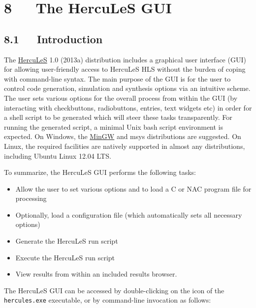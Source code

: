 \documentclass[a4paper]{article}
\begin{document}
\section{8~~~The HercuLeS GUI%
  \label{the-hercules-gui}%
}


\subsection{8.1~~~Introduction%
  \label{id3}%
}

The \href{http://www.ajaxcompilers.com/technology/hercules-high-level-synthesis}{HercuLeS} 1.0 (2013a) distribution includes a graphical user interface (GUI) for allowing user-friendly access to HercuLeS HLS without the burden of coping with command-line syntax. The main purpose of the GUI is for the user to control code generation, simulation and synthesis options via an intuitive scheme. The user
sets various options for the overall process from within the GUI (by interacting with checkbuttons, radiobuttons, entries, text widgets etc) in order for a shell script to be generated which will steer these tasks transparently. For running the generated script, a minimal Unix bash script environment is expected. On Windows, the \href{http://www.mingw.org}{MinGW} and msys distributions are suggested. On Linux, the required facilities are natively supported in almost any distributions, including Ubuntu Linux 12.04 LTS.

To summarize, the HercuLeS GUI performs the following tasks:
%
\begin{itemize}

\item Allow the user to set various options and to load a C or NAC program file for processing

\item Optionally, load a configuration file (which automatically sets all necessary options)

\item Generate the HercuLeS run script

\item Execute the HercuLeS run script

\item View results from within an included results browser.

\end{itemize}

The HercuLeS GUI can be accessed by double-clicking on the icon of the \texttt{hercules.exe} executable, or by command-line invocation as follows:
\end{document}
